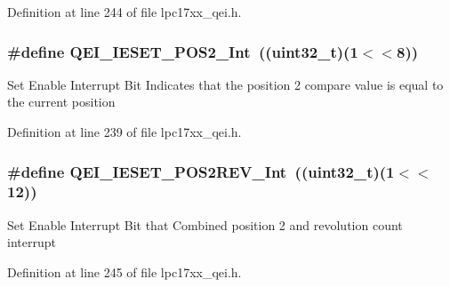 \-Definition at line 244 of file lpc17xx\-\_\-qei.\-h.

\hypertarget{group___q_e_i___private___macros_gaeddd5f20aee97ad2ba44011257fd8a3c}{
\subsubsection[{\-Q\-E\-I\-\_\-\-I\-E\-S\-E\-T\-\_\-\-P\-O\-S2\-\_\-\-Int}]{\setlength{\rightskip}{0pt plus 5cm}\#define {\bf \-Q\-E\-I\-\_\-\-I\-E\-S\-E\-T\-\_\-\-P\-O\-S2\-\_\-\-Int}~((uint32\-\_\-t)(1$<$$<$8))}}\label{group___q_e_i___private___macros_gaeddd5f20aee97ad2ba44011257fd8a3c}
\-Set \-Enable \-Interrupt \-Bit \-Indicates that the position 2 compare value is equal to the current position 

\-Definition at line 239 of file lpc17xx\-\_\-qei.\-h.

\hypertarget{group___q_e_i___private___macros_gaa0704486eb62ac5a76ce7c3af1c352d6}{
\subsubsection[{\-Q\-E\-I\-\_\-\-I\-E\-S\-E\-T\-\_\-\-P\-O\-S2\-R\-E\-V\-\_\-\-Int}]{\setlength{\rightskip}{0pt plus 5cm}\#define {\bf \-Q\-E\-I\-\_\-\-I\-E\-S\-E\-T\-\_\-\-P\-O\-S2\-R\-E\-V\-\_\-\-Int}~((uint32\-\_\-t)(1$<$$<$12))}}\label{group___q_e_i___private___macros_gaa0704486eb62ac5a76ce7c3af1c352d6}
\-Set \-Enable \-Interrupt \-Bit that \-Combined position 2 and revolution count interrupt 

\-Definition at line 245 of file lpc17xx\-\_\-qei.\-h.

